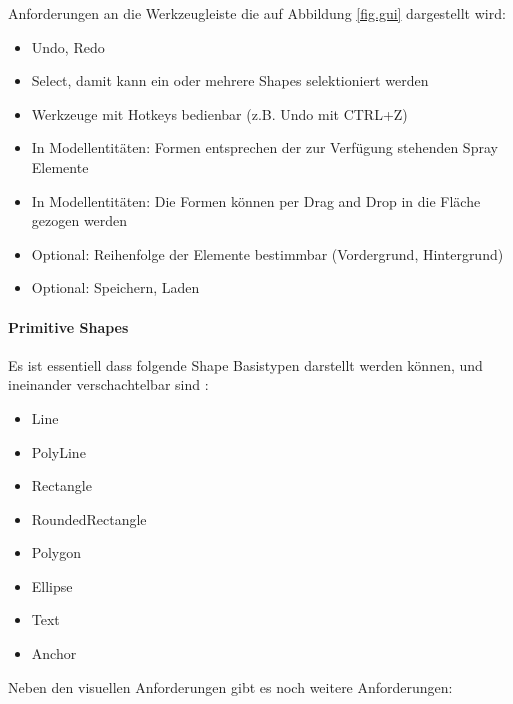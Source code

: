 \noindent Anforderungen an die Werkzeugleiste die auf Abbildung
\ref{fig.gui} dargestellt wird:

\begin{itemize}
  \item Undo, Redo
  \item Select,  damit kann ein oder mehrere Shapes selektioniert werden
  \item Werkzeuge mit Hotkeys bedienbar (z.B. Undo mit CTRL+Z)
  \item In Modellentitäten: Formen entsprechen der zur Verfügung stehenden Spray Elemente
  \item In Modellentitäten: Die Formen können per Drag and Drop in die Fläche gezogen werden
  \item Optional: Reihenfolge der Elemente bestimmbar (Vordergrund, Hintergrund)
  \item Optional: Speichern, Laden
\end{itemize}


\paragraph{Primitive Shapes}\label{sec.primitivShapes}

Es ist essentiell dass folgende Shape Basistypen darstellt werden können,
und ineinander verschachtelbar sind
\citep[siehe Kapitel \emph{The Shape grammar}][]{sprayUser}:

\begin{itemize}
  \item Line
  \item PolyLine
  \item Rectangle
  \item RoundedRectangle
  \item Polygon
  \item Ellipse
  \item Text
  \item Anchor
\end{itemize}

\noindent Neben den visuellen Anforderungen gibt es noch weitere Anforderungen:

